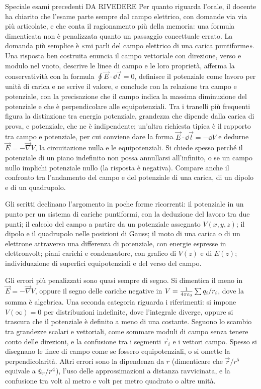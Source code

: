 \documentclass[11pt,a4paper]{article}
\begin{document}
\begin{riquadro}{Speciale esami precedenti DA RIVEDERE}
Per quanto riguarda l'orale, il docente ha chiarito che l'esame parte sempre dal campo elettrico, con domande via via più articolate, e che conta il ragionamento più della memoria: una formula dimenticata non è penalizzata quanto un passaggio concettuale errato. La domanda più semplice è «mi parli del campo elettrico di una carica puntiforme». Una risposta ben costruita enuncia il campo vettoriale con direzione, verso e modulo nel vuoto, descrive le linee di campo e le loro proprietà, afferma la conservatività con la formula $\oint\vec E\cdot\dd\vec l=0$, definisce il potenziale come lavoro per unità di carica e ne scrive il valore, e conclude con la relazione tra campo e potenziale, con la precisazione che il campo indica la massima diminuzione del potenziale e che è perpendicolare alle equipotenziali. Tra i tranelli più frequenti figura la distinzione tra energia potenziale, grandezza che dipende dalla carica di prova, e potenziale, che ne è indipendente; un'altra richiesta tipica è il rapporto tra campo e potenziale, per cui conviene dare la forma $\vec E\cdot\dd\vec l=-\dd V$ e dedurne $\vec E=-\vec \nabla V$, la circuitazione nulla e le equipotenziali. Si chiede spesso perché il potenziale di un piano indefinito non possa annullarsi all'infinito, o se un campo nullo implichi potenziale nullo (la risposta è negativa). Compare anche il confronto tra l'andamento del campo e del potenziale di una carica, di un dipolo e di un quadrupolo.

Gli scritti declinano l'argomento in poche forme ricorrenti: il potenziale in un punto per un sistema di cariche puntiformi, con la deduzione del lavoro tra due punti; il calcolo del campo a partire da un potenziale assegnato $V(x,y,z)$; il dipolo e il quadrupolo nelle posizioni di Gauss; il moto di una carica o di un elettrone attraverso una differenza di potenziale, con energie espresse in elettronvolt; piani carichi e condensatore, con grafico di $V(z)$ e di $E(z)$; individuazione di superfici equipotenziali e del verso del campo.

Gli errori più penalizzati sono quasi sempre di segno. Si dimentica il meno in $\vec E=-\vec \nabla V$, oppure il segno delle cariche negative in $V=\frac{1}{4\pi\varepsilon_0}\sum q_i/r_i$, dove la somma è algebrica. Una seconda categoria riguarda i riferimenti: si impone $V(\infty)=0$ per distribuzioni indefinite, dove l'integrale diverge, oppure si trascura che il potenziale è definito a meno di una costante. Seguono lo scambio tra grandezze scalari e vettoriali, come sommare moduli di campo senza tenere conto delle direzioni, e la confusione tra i segmenti $\vec r_i$ e i vettori campo. Spesso si disegnano le linee di campo come se fossero equipotenziali, o si omette la perpendicolarità. Altri errori sono la dipendenza da $r$ (dimenticare che $\vec r/r^5$ equivale a $\hat{u}_r/r^4$), l'uso delle approssimazioni a distanza ravvicinata, e la confusione tra volt al metro e volt per metro quadrato o altre unità.
\end{riquadro}
\end{document}
